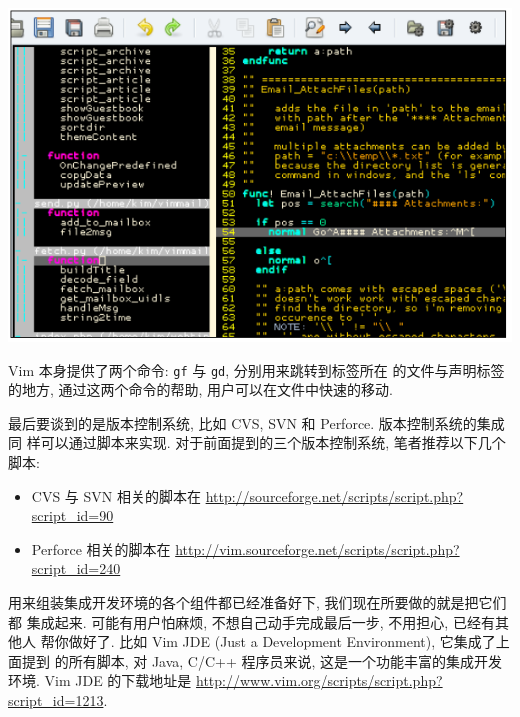 \begin{center}
    \includegraphics[scale=0.6]{./images/page209.png}
\end{center}
Vim 本身提供了两个命令: \texttt{gf} 与 \texttt{gd}, 分别用来跳转到标签所在
的文件与声明标签的地方, 通过这两个命令的帮助, 用户可以在文件中快速的移动.

最后要谈到的是版本控制系统, 比如 CVS, SVN 和 Perforce. 版本控制系统的集成同
样可以通过脚本来实现. 对于前面提到的三个版本控制系统, 笔者推荐以下几个脚本:
\begin{itemize}
    \item CVS 与 SVN 相关的脚本在
        \url{http://sourceforge.net/scripts/script.php?script_id=90}
    \item Perforce 相关的脚本在
        \url{http://vim.sourceforge.net/scripts/script.php?script_id=240}
\end{itemize}

用来组装集成开发环境的各个组件都已经准备好下, 我们现在所要做的就是把它们都
集成起来. 可能有用户怕麻烦, 不想自己动手完成最后一步, 不用担心, 已经有其他人
帮你做好了. 比如 Vim JDE (Just a Development Environment), 它集成了上面提到
的所有脚本, 对 Java, C/C++ 程序员来说, 这是一个功能丰富的集成开发环境. Vim JDE
的下载地址是 \url{http://www.vim.org/scripts/script.php?script_id=1213}.
